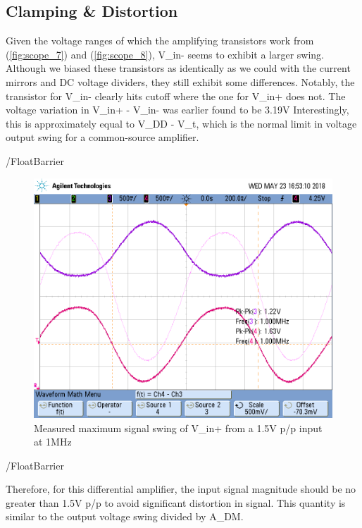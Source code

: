\subsection{Clamping & Distortion}

Given the voltage ranges of which the amplifying transistors work from (\ref{fig:scope_7}) and (\ref{fig:scope_8}), V_{in-} seems to exhibit a larger swing.
Although we biased these transistors as identically as we could with the current mirrors and DC voltage dividers, they still exhibit some differences.
Notably, the transistor for V_{in-} clearly hits cutoff where the one for V_{in+} does not.
The voltage variation in V_{in+} - V_{in-} was earlier found to be 3.19\si{\volt}
Interestingly, this is approximately equal to V_{DD} - V_{t}, which is the normal limit in voltage output swing for a common-source amplifier.

/FloatBarrier

\begin{figure}[h!]
	\centering
	\includegraphics[scale=0.60]{./images/scope_6}
	\caption{Measured maximum signal swing of V_{in+} from a 1.5\si{\volt} p/p input at 1MHz}
	\label{fig:scope_6}
\end{figure}

/FloatBarrier

Therefore, for this differential amplifier, the input signal magnitude should be no greater than 1.5V p/p to avoid significant distortion in signal.
This quantity is similar to the output voltage swing divided by A_{DM}.